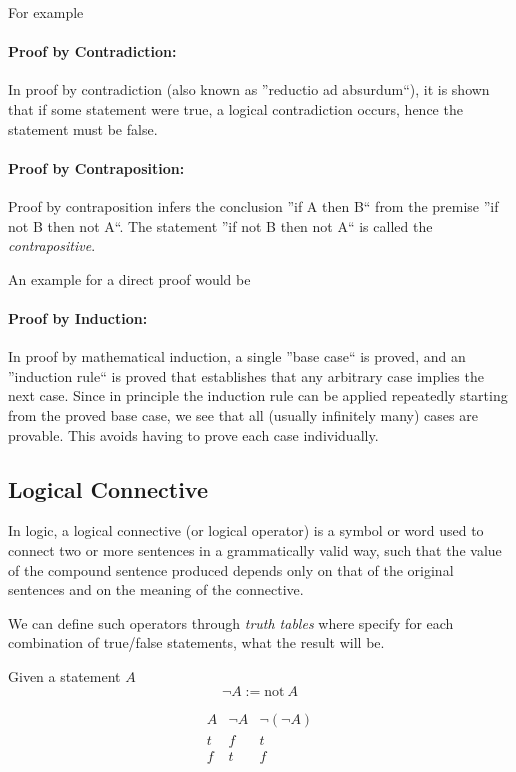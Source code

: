 For example
\paragraph{Proof by Contradiction:} In proof by contradiction (also known as ''reductio ad absurdum``), it is shown that if some statement were true, a logical contradiction occurs, hence the statement must be false.
\paragraph{Proof by Contraposition:} Proof by contraposition infers the conclusion ''if A then B`` from the premise ''if not B then not A``.
The statement ''if not B then not A`` is called the \textit{contrapositive}.

An example for a direct proof would be
\paragraph{Proof by Induction:} In proof by mathematical induction, a single ''base case`` is proved, and an ''induction rule`` is proved that establishes that any arbitrary case implies the next case.
Since in principle the induction rule can be applied repeatedly starting from the proved base case, we see that all (usually infinitely many) cases are provable.
This avoids having to prove each case individually.

\subsection{Logical Connective}
In logic, a logical connective (or logical operator) is a symbol or word used to connect two or more sentences in a grammatically valid way, such that the value of the compound sentence produced depends only on that of the original sentences and on the meaning of the connective.

We can define such operators through \textit{truth tables} where specify for each combination of true/false statements, what the result will be.

\begin{definition}[Negation]
   Given a statement \(A\)
   \[\neg A := \text{not}~A\]

   \[\begin{array}{c||c|c}
         A & \neg A & \neg(\neg A)\\
         \hline
         t & f & t\\
         f & t & f
      \end{array}\]
\end{definition}

